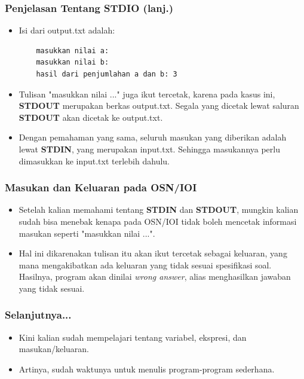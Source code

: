 \begin{frame}[fragile]
\frametitle{Penjelasan Tentang STDIO (lanj.)}
\begin{itemize}
  \item Isi dari output.txt adalah:
  \begin{lstlisting}
    masukkan nilai a:
    masukkan nilai b:
    hasil dari penjumlahan a dan b: 3
  \end{lstlisting}
  \item Tulisan "masukkan nilai ..." juga ikut tercetak, karena pada kasus ini, \textbf{STDOUT} merupakan berkas output.txt. Segala yang dicetak lewat saluran \textbf{STDOUT} akan dicetak ke output.txt.
  \item Dengan pemahaman yang sama, seluruh masukan yang diberikan adalah lewat \textbf{STDIN}, yang merupakan input.txt. Sehingga masukannya perlu dimasukkan ke input.txt terlebih dahulu.
\end{itemize}
\end{frame}

\begin{frame}
\frametitle{Masukan dan Keluaran pada OSN/IOI}
\begin{itemize}
  \item Setelah kalian memahami tentang \textbf{STDIN} dan \textbf{STDOUT}, mungkin kalian sudah bisa menebak kenapa pada OSN/IOI tidak boleh mencetak informasi masukan seperti "masukkan nilai ...".
  \item Hal ini dikarenakan tulisan itu akan ikut tercetak sebagai keluaran, yang mana mengakibatkan ada keluaran yang tidak sesuai spesifikasi soal. Hasilnya, program akan dinilai \alert{\textit{wrong answer}}, alias menghasilkan jawaban yang tidak sesuai.
\end{itemize}
\end{frame}

\begin{frame}
\frametitle{Selanjutnya...}
\begin{itemize}
  \item Kini kalian sudah mempelajari tentang variabel, ekspresi, dan masukan/keluaran.
  \item Artinya, sudah waktunya untuk menulis program-program sederhana.
\end{itemize}
\end{frame}



